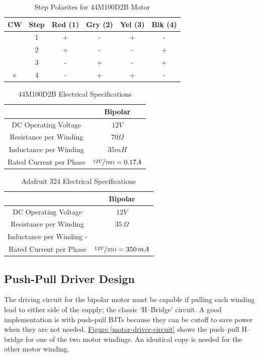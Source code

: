 \documentclass[10pt, twocolumn]{article}
\begin{document}
\begin{table}
\centering
\caption{Step Polarites for 44M100D2B Motor}
\begin{tabular}{c | c | c | c | c | c}
\hline\hline
CW	&Step	&Red (1)&Gry (2)&Yel (3)&Blk (4)	\\
\hline\hline
\verb1|1	&1	&+	&-	&+	&-	\\
\verb1|1	&2	&+	&-	&-	&+	\\
\verb1|1	&3	&-	&+	&-	&+	\\
v		&4	&-	&+	&+	&-	\\
\hline\hline
\end{tabular}
\label{44M100D2B-polarities}
\end{table}

\begin{table}
\centering
\caption{44M100D2B Electrical Specifications}
\begin{tabular}{c | c }
\hline\hline
&Bipolar	\\
\hline\hline
DC Operating Voltage	&$12V$	\\
Resistance per Winding	&$70\Omega$	\\
Inductance per Winding	&$35mH$	\\
Rated Current per Phase	&$\nicefrac{12V}{70\Omega}=0.17A$	\\
\hline\hline
\end{tabular}
\end{table}

\begin{table}
\centering
\caption{Adafruit 324 Electrical Specifications}
\begin{tabular}{c | c }
\hline\hline
&Bipolar	\\
\hline\hline
DC Operating Voltage	&$12V$	\\
Resistance per Winding	&$35\,\Omega$	\\
Inductance per Winding	-	\\
Rated Current per Phase	&$\nicefrac{12V}{35\Omega}=350\,mA$	\\
\hline\hline
\end{tabular}
\end{table}

\subsection{Push-Pull Driver Design}

The driving circuit for the bipolar motor must be capable if pulling 
each winding lead to either side of the supply; the classic
`H--Bridge' circuit.
A good implementation is with push-pull BJTs because they can be
cutoff to save power when they are not needed.
\hyperref[motor-driver-circuit]{Figure \ref{motor-driver-circuit}}
shows the push--pull H--bridge for one of the two motor windings.
An identical copy is needed for the other motor winding.
\end{document}
